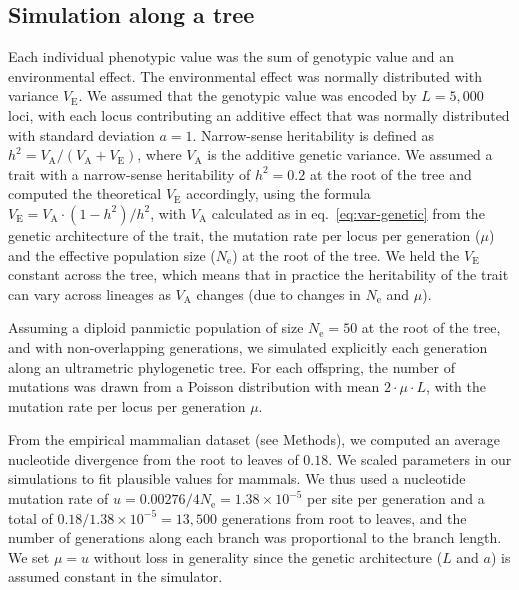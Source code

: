 \documentclass{article}
\newcommand{\Multiply}{\cdot}
\newcommand{\Ne}{N_{\text{e}}}
\newcommand{\Heritability}{h^2}
\newcommand{\MutationRatePheno}{\mu}
\newcommand{\MutationRateNuc}{u}
\newcommand{\NbrLoci}{L}
\newcommand{\VarEnv}{V_{\mathrm{E}}}
\newcommand{\VarGenetic}{V_{\mathrm{A}}}
\begin{document}
\subsection{Simulation along a tree}\label{subsec:simulation-along-a-tree}
Each individual phenotypic value was the sum of genotypic value and an environmental effect.
The environmental effect was normally distributed with variance $\VarEnv$.
We assumed that the genotypic value was encoded by $\NbrLoci=5,000$ loci, with each locus contributing an additive effect that was normally distributed with standard deviation $a=1$.
Narrow-sense heritability is defined as $\Heritability = \VarGenetic / (\VarGenetic + \VarEnv)$, where $\VarGenetic$ is the additive genetic variance.
We assumed a trait with a narrow-sense heritability of $\Heritability=0.2$ at the root of the tree and computed the theoretical $\VarEnv$ accordingly, using the formula $\VarEnv = \VarGenetic \Multiply (1 - \Heritability) / \Heritability$, with $\VarGenetic$ calculated as in eq.~\ref{eq:var-genetic} from the genetic architecture of the trait, the mutation rate per locus per generation ($\MutationRatePheno$) and the effective population size ($\Ne$) at the root of the tree.
We held the $\VarEnv$ constant across the tree, which means that in practice the heritability of the trait can vary across lineages as $\VarGenetic$ changes (due to changes in $\Ne$ and $\MutationRatePheno$).

Assuming a diploid panmictic population of size $\Ne=50$ at the root of the tree, and with non-overlapping generations, we simulated explicitly each generation along an ultrametric phylogenetic tree.
For each offspring, the number of mutations was drawn from a Poisson distribution with mean $2 \Multiply \MutationRatePheno \Multiply \NbrLoci $, with the mutation rate per locus per generation $\MutationRatePheno$.

From the empirical mammalian dataset (see Methods), we computed an average nucleotide divergence from the root to leaves of $0.18$.
We scaled parameters in our simulations to fit plausible values for mammals.
We thus used a nucleotide mutation rate of $\MutationRateNuc=0.00276 / 4 \Ne = 1.38 \times 10^{-5}$ per site per generation and a total of $0.18 / 1.38 \times 10^{-5} = 13,500$ generations from root to leaves, and the number of generations along each branch was proportional to the branch length.
We set $\MutationRatePheno=\MutationRateNuc$ without loss in generality since the genetic architecture ($\NbrLoci$ and $a$) is assumed constant in the simulator.
\end{document}

